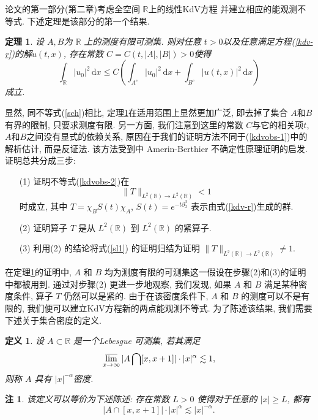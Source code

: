 \documentclass[master]{cugthesis}
\newcommand\R{\ensuremath{\mathbb{R}}}
\renewcommand\d{\ensuremath{\,\mathrm{d}}}
\newtheorem{theorem}{定理}[chapter]
\newtheorem*{remark}{注}
\newtheorem{definition}{定义}
\begin{document}
    论文的第一部分(第二章)考虑全空间 $\R $上的线性KdV方程
    并建立相应的能观测不等式. 下述定理是该部分的第一个结果.
    \begin{theorem}\label{thm-1}
     设 $A, B$为 $\R$ 上的测度有限可测集. 则对任意 $t>0$以及任意满足方程(\ref{kdv-r})的解$u(t,x)$, 存在常数 $C=C(t,|A|,|B|)>0$使得
     \begin{equation}
         \int_{\R} |u_0|^2 \d x\le C\left(\int_{A^c}|u_0|^2\d x+\int_{B^c}|u(t,x)|^2\d x\right)\label{kdvobs-2}
     \end{equation}
     成立.
    \end{theorem}
    显然, 同不等式(\ref{sch})相比, 定理\ref{thm-1}在适用范围上显然更加广泛, 即去掉了集合 $A$和$B$有界的限制, 只要求测度有限. 另一方面, 我们注意到这里的常数 $C$与它的相关项$t$, $A$和$B$之间没有显式的依赖关系, 原因在于我们的证明方法不同于(\ref{kdvobs-1})中的解析估计, 而是反证法. 该方法受到\cite{Amrein1977OnSP}中 Amerin-Berthier 不确定性原理证明的启发. 证明总共分成三步:
    \begin{enumerate}
        \item[(1)] 证明不等式(\ref{kdvobs-2})在
        \begin{equation}
            \|T\|_{L^{2}(\R)\to L^2(\R)}<1\label{sl1}
        \end{equation}
        时成立, 其中 $T=\chi_BS(t)\chi_A$, $S(t)=e^{-t\partial_x^3}$ 表示由式(\ref{kdv-r})生成的群.
        \item[(2)] 证明算子 $T$ 是从 $L^2(\R)$ 到 $L^2(\R)$ 的紧算子.
        \item[(3)] 利用(2) 的结论将式(\ref{sl1}) 的证明归结为证明 $\| T\|_{L^2(\R)\to L^2(\R)}\neq 1$.
    \end{enumerate}
    
    在定理\ref{thm-1}的证明中, $A$ 和 $B$ 均为测度有限的可测集这一假设在步骤(2)和(3)的证明中都被用到. 通过对步骤(2) 更进一步地观察, 我们发现, 如果 $A$ 和 $B$ 满足某种密度条件, 算子 $T$ 仍然可以是紧的. 由于在该密度条件下, $A$ 和 $B$ 的测度可以不是有限的, 我们便可以建立KdV方程新的两点能观测不等式. 为了陈述该结果, 我们需要下述关于集合密度的定义.
    \begin{definition}
    设 $A\subset \R$ 是一个Lebesgue 可测集, 若其满足
    \begin{equation*}
         \varlimsup_{x\to \infty}|A\bigcap[x,x+1]|\cdot|x|^{\alpha}\lesssim 1,
    \end{equation*}
    则称 $A$ 具有 $|x|^{-\alpha}$密度.
    \end{definition}
    \begin{remark}
    该定义可以等价为下述陈述: 存在常数 $L>0$ 使得对于任意的 $|x|\ge L$, 都有
    \begin{equation*}
        |A\cap [x,x+1]|\cdot |x|^\alpha\lesssim |x|^{-\alpha}.
    \end{equation*}
    \end{remark}
    
\end{document}
